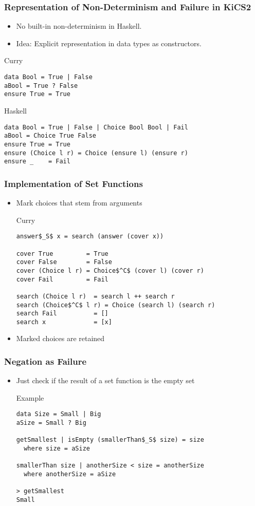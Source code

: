 \documentclass[utf8]{beamer}
\begin{document}
\begin{frame}[fragile]
\frametitle{Representation of Non-Determinism and Failure in KiCS2}
\begin{itemize}
  \item No built-in non-determinism in Haskell.
  \item Idea: Explicit representation in data types as constructors.
\end{itemize}
\pause
\begin{block}{Curry}
\begin{lstlisting}
data Bool = True | False
aBool = True ? False
ensure True = True
\end{lstlisting}
\end{block}

\begin{block}{Haskell}
\begin{lstlisting}
data Bool = True | False | Choice Bool Bool | Fail
aBool = Choice True False
ensure True = True
ensure (Choice l r) = Choice (ensure l) (ensure r)
ensure _    = Fail
\end{lstlisting}
\end{block}
\end{frame}

\begin{frame}[fragile]
\frametitle{Implementation of Set Functions}
\begin{itemize}
\item Mark choices that stem from arguments
\begin{block}{Curry}
\begin{lstlisting}[mathescape]
answer$_S$ x = search (answer (cover x))

cover True         = True
cover False        = False
cover (Choice l r) = Choice$^C$ (cover l) (cover r)
cover Fail         = Fail 

search (Choice l r)  = search l ++ search r
search (Choice$^C$ l r) = Choice (search l) (search r)
search Fail          = []
search x             = [x]
\end{lstlisting}
\end{block}
\item Marked choices are retained 
\end{itemize}
\end{frame}

\begin{frame}[fragile]
\frametitle{Negation as Failure}
\begin{itemize}
\item Just check if the result of a set function is the empty set
\begin{block}{Example}
\begin{lstlisting}[mathescape]
data Size = Small | Big
aSize = Small ? Big

getSmallest | isEmpty (smallerThan$_S$ size) = size
  where size = aSize

smallerThan size | anotherSize < size = anotherSize
  where anotherSize = aSize

> getSmallest
Small
\end{lstlisting}
\end{block}
\end{itemize}
\end{frame}
\end{document}
